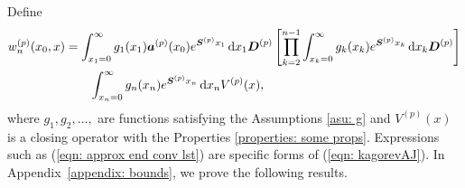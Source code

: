 Define 
\begin{align}
		w_n^{(p)}(x_0,x) &= \int_{x_1=0}^\infty g_1(x_1) \boldsymbol a ^{(p)}(x_0) e^{\boldsymbol{S}^{(p)}x_1}\, \mathrm{d} x_1\boldsymbol D^{(p)} 
            	\left[\prod_{k=2}^{n-1}\int_{x_k=0}^\infty g_k(x_k) e^{\boldsymbol{S}^{(p)}x_k} \, \mathrm{d} x_k \boldsymbol D^{(p)}\right] \nonumber 
		\\&\qquad{} \int_{x_n=0}^\infty g_{n}(x_n) e^{\boldsymbol{S}^{(p)}x_n} \, \mathrm{d} x_n V^{(p)}(x), \label{eqn: kagorevAJ}
\end{align}
where \(g_1,g_2,\dots,\) are functions satisfying the Assumptions \ref{asu: g} and \(V^{(p)}(x)\) is a closing operator with the Properties \ref{properties: some props}. Expressions such as (\ref{eqn: approx end conv lst}) are specific forms of (\ref{eqn: kagorevAJ}). In Appendix~\ref{appendix: bounds}, we prove the following results. %

